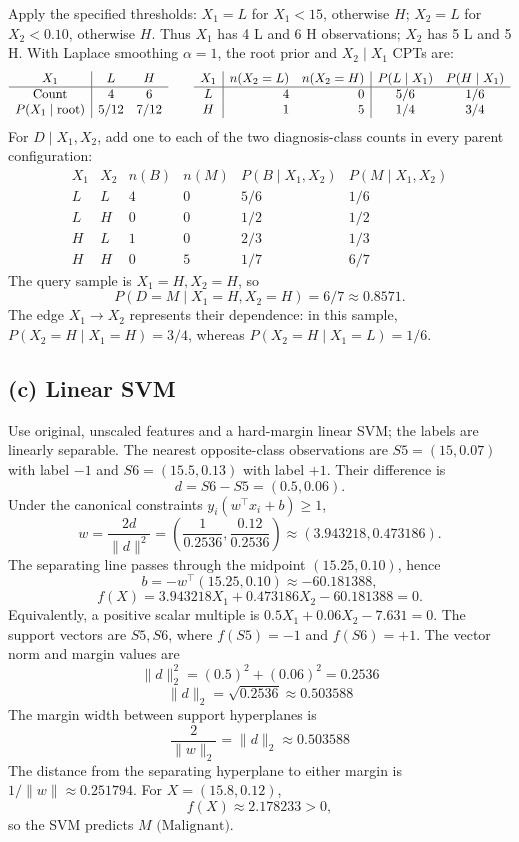\documentclass[11pt,a4paper]{article}
\begin{document}
Apply the specified thresholds: \(X_1=L\) for \(X_1<15\), otherwise \(H\);
\(X_2=L\) for \(X_2<0.10\), otherwise \(H\). Thus \(X_1\) has 4 L and 6 H observations; \(X_2\) has 5 L and 5 H.
With Laplace smoothing \(\alpha=1\), the root prior and \(X_2\mid X_1\) CPTs are:
\[
\begin{array}{c|cc}
X_1&L&H\\ \hline
\text{Count}&4&6\\
P(X_1\mid\text{root})&5/12&7/12
\end{array}
\qquad
\begin{array}{c|r r|cc}
X_1&n(X_2=L)&n(X_2=H)&P(L\mid X_1)&P(H\mid X_1)\\ \hline
L&4&0&5/6&1/6\\
H&1&5&1/4&3/4
\end{array}
\]
For \(D\mid X_1,X_2\), add one to each of the two diagnosis-class counts in every parent configuration:
\[
\begin{array}{cc|rr|cc}
X_1&X_2&n(B)&n(M)&P(B\mid X_1,X_2)&P(M\mid X_1,X_2)\\ \hline
L&L&4&0&5/6&1/6\\
L&H&0&0&1/2&1/2\\
H&L&1&0&2/3&1/3\\
H&H&0&5&1/7&6/7
\end{array}
\]
The query sample is \(X_1=H,X_2=H\), so
\[
\boxed{P(D=M\mid X_1=H,X_2=H)=6/7\approx0.8571.}
\]
The edge \(X_1\to X_2\) represents their dependence: in this sample, \(P(X_2=H\mid X_1=H)=3/4\), whereas \(P(X_2=H\mid X_1=L)=1/6\).

\subsection*{(c) Linear SVM}
Use original, unscaled features and a hard-margin linear SVM; the labels are linearly separable. The nearest opposite-class observations are \(S5=(15,0.07)\) with label \(-1\) and \(S6=(15.5,0.13)\) with label \(+1\). Their difference is
\[
d=S6-S5=(0.5,0.06).
\]
Under the canonical constraints \(y_i(w^\top x_i+b)\geq1\),
\[
w=\frac{2d}{\|d\|^2}
=\left(\frac{1}{0.2536},\frac{0.12}{0.2536}\right)
\approx(3.943218,0.473186).
\]
The separating line passes through the midpoint \((15.25,0.10)\), hence
\[
b=-w^\top(15.25,0.10)\approx-60.181388,
\]
\[
\boxed{f(X)=3.943218X_1+0.473186X_2-60.181388=0.}
\]
Equivalently, a positive scalar multiple is \(0.5X_1+0.06X_2-7.631=0\).
The support vectors are \(S5,S6\), where \(f(S5)=-1\) and \(f(S6)=+1\).
The vector norm and margin values are
\[
\|d\|_2^2 = (0.5)^2 + (0.06)^2 = 0.2536
\]
\[
\|d\|_2 = \sqrt{0.2536} \approx 0.503588
\]
The margin width between support hyperplanes is
\[
\frac{2}{\|w\|_2} = \|d\|_2 \approx 0.503588
\]
The distance from the separating hyperplane to either margin is
\(1/\|w\|\approx0.251794\).
For \(X=(15.8,0.12)\),
\[
f(X)\approx2.178233>0,
\]
so the SVM predicts \(\boxed{M\text{ (Malignant)}}\).
\end{document}
